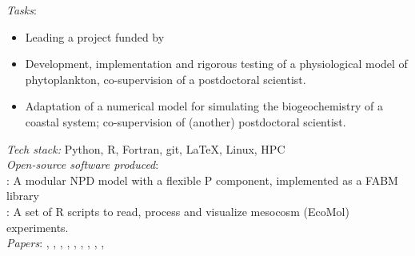\documentclass[
	a4paper,
]{fortysecondscv}
\begin{document}
\begin{cvtable}[1.0]
	{\href{https://uol.de/en/icbm}{\color{pblue}{ICBM, University of Oldenburg, Germany}}}
	{\textit{Tasks}:
	\begin{itemize}[topsep=0pt,itemsep=0pt,partopsep=0pt, parsep=0pt, leftmargin=*]
     \item Leading a project funded by \href{https://www.dfg.de/en}{\color{blue}{DFG}}
     \item Development, implementation and rigorous testing of a physiological model of phytoplankton, co-supervision of a postdoctoral scientist.%
     \item Adaptation of a numerical model for simulating the biogeochemistry of a coastal system; co-supervision of (another) postdoctoral scientist.
    \end{itemize}
      \textit{Tech stack:} Python, R, Fortran, git, \LaTeX, Linux, HPC\\  
      \textit{Open-source software produced}:\\
      \href{https://github.com/OnurKerimoglu/fabm-nflexpd}{\color{pblue}{FABM-NflexPD}}: A modular NPD model with a flexible P component, implemented as a FABM library\\
      \href{https://github.com/OnurKerimoglu/R-EcoMol}{\color{pblue}{R-EcoMol}}: A set of R scripts to read, process and visualize mesocosm (EcoMol) experiments.\\
      \textit{Papers}:
      \href{https://doi.org/10.1016/j.ecolmodel.2020.109401}{\color{pblue}{1}}, 
      \href{https://doi.org/10.1111/ele.13680}{\color{pblue}{2}}, 
      \href{https://doi.org/10.5194/gmd-14-6025-2021}{\color{pblue}{3}}, 
      \href{https://doi.org/10.3389/fmars.2021.675428}{\color{pblue}{4}}, 
      \href{https://doi.org/10.1002/lno.12005}{\color{pblue}{5}}, 
      \href{https://doi.org/10.3389/fmars.2022.975414}{\color{pblue}{6}}, 
      \href{https://doi.org/10.1016/j.scitotenv.2022.158757}{\color{pblue}{7}},
      \href{https://ospar.org/documents?v=48846}{\color{pblue}{8}}, 
      \href{https://doi.org/10.5194/egusphere-2022-493}{\color{pblue}{9}}, 
      \href{https://doi.org/10.1101/2022.05.18.492269}{\color{pblue}{10}}
    }
    

\end{cvtable}
\end{document}
